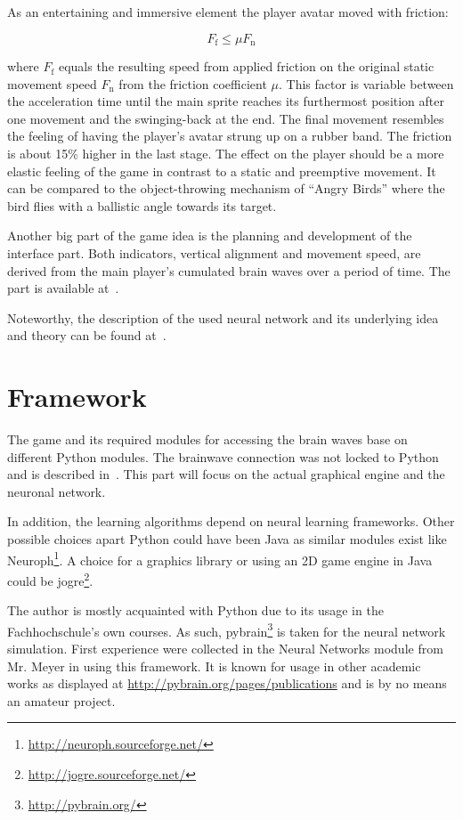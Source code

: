 \documentclass[bibtotocnumbered, headsepline,normalheadings,12pt]{report}
\begin{document}
As an entertaining and immersive element the player avatar moved with friction:

\[ F_\mathrm{f} \leq \mu F_\mathrm{n} \]

where \( F_\mathrm{f} \) equals the resulting speed from applied friction on the original static movement speed \( F_\mathrm{n} \) from the 
friction coefficient  \( \mu \). This factor is variable between the acceleration time until the main sprite reaches its furthermost position after
one movement and the swinging-back at the end. The final movement resembles the feeling of having the player's avatar strung up on a rubber band. The
friction is about 15\% higher in the last stage. 
The effect on the player should be a more elastic feeling of the game in contrast to a static and preemptive movement. It can be compared to the
object-throwing mechanism of ``Angry Birds'' where the bird flies with a ballistic angle towards its target.

Another big part of the game idea is the planning and development of the interface part. Both indicators, vertical alignment and movement speed, are
derived from the main player's cumulated brain waves over a period of time. The part is available at~\cite[p. 11--28]{pm}.

Noteworthy, the description of the used neural network and its underlying idea and theory can be found at~\cite[p. 4--8]{pm}.

\chapter{Framework}
\label{chap:framework}

The game and its required modules for accessing the brain waves base on different Python modules. The brainwave connection was 
not locked to Python and is described in~\cite{pm}. This part will focus on the actual graphical engine and the neuronal network.

In addition, the learning algorithms depend on neural learning frameworks. Other possible choices
apart Python could have been Java as similar modules exist like Neuroph\footnote{\url{http://neuroph.sourceforge.net/}}.
A choice for a graphics library or using an 2D game engine in Java could be jogre\footnote{\url{http://jogre.sourceforge.net/}}.

The author is mostly acquainted with Python due to its usage in the Fachhochschule's own courses. As such, 
pybrain\footnote{\url{http://pybrain.org/}} is taken for the neural network simulation. First experience were collected
in the Neural Networks module from Mr. Meyer in using this framework. It is known for usage in other academic works as 
displayed at \url{http://pybrain.org/pages/publications} and is by no means an amateur project.
\end{document}

